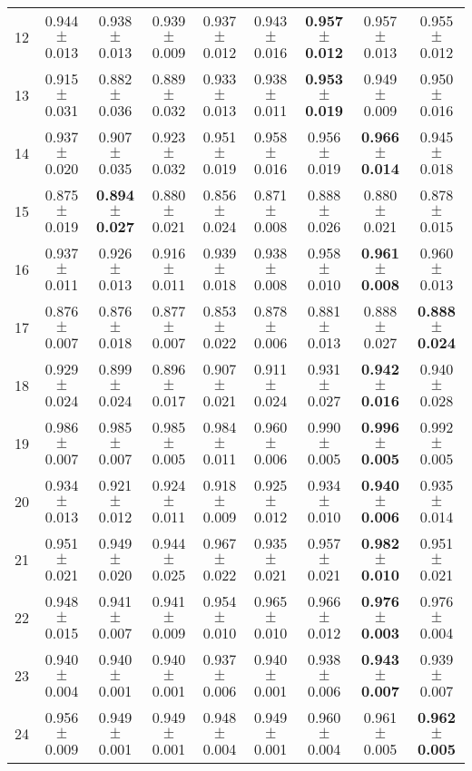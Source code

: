 \begin{table}[!ht]
{\begin{tabular}{r c c c c c c c c}
12 & 0.944 $\pm$ 0.013 & 0.938 $\pm$ 0.013 & 0.939 $\pm$ 0.009 & 0.937 $\pm$ 0.012 & 0.943 $\pm$ 0.016 & \textbf{0.957 $\pm$ 0.012} & 0.957 $\pm$ 0.013 & 0.955 $\pm$ 0.012 \\
13 & 0.915 $\pm$ 0.031 & 0.882 $\pm$ 0.036 & 0.889 $\pm$ 0.032 & 0.933 $\pm$ 0.013 & 0.938 $\pm$ 0.011 & \textbf{0.953 $\pm$ 0.019} & 0.949 $\pm$ 0.009 & 0.950 $\pm$ 0.016 \\
14 & 0.937 $\pm$ 0.020 & 0.907 $\pm$ 0.035 & 0.923 $\pm$ 0.032 & 0.951 $\pm$ 0.019 & 0.958 $\pm$ 0.016 & 0.956 $\pm$ 0.019 & \textbf{0.966 $\pm$ 0.014} & 0.945 $\pm$ 0.018 \\
15 & 0.875 $\pm$ 0.019 & \textbf{0.894 $\pm$ 0.027} & 0.880 $\pm$ 0.021 & 0.856 $\pm$ 0.024 & 0.871 $\pm$ 0.008 & 0.888 $\pm$ 0.026 & 0.880 $\pm$ 0.021 & 0.878 $\pm$ 0.015 \\
16 & 0.937 $\pm$ 0.011 & 0.926 $\pm$ 0.013 & 0.916 $\pm$ 0.011 & 0.939 $\pm$ 0.018 & 0.938 $\pm$ 0.008 & 0.958 $\pm$ 0.010 & \textbf{0.961 $\pm$ 0.008} & 0.960 $\pm$ 0.013 \\
17 & 0.876 $\pm$ 0.007 & 0.876 $\pm$ 0.018 & 0.877 $\pm$ 0.007 & 0.853 $\pm$ 0.022 & 0.878 $\pm$ 0.006 & 0.881 $\pm$ 0.013 & 0.888 $\pm$ 0.027 & \textbf{0.888 $\pm$ 0.024} \\
18 & 0.929 $\pm$ 0.024 & 0.899 $\pm$ 0.024 & 0.896 $\pm$ 0.017 & 0.907 $\pm$ 0.021 & 0.911 $\pm$ 0.024 & 0.931 $\pm$ 0.027 & \textbf{0.942 $\pm$ 0.016} & 0.940 $\pm$ 0.028 \\
19 & 0.986 $\pm$ 0.007 & 0.985 $\pm$ 0.007 & 0.985 $\pm$ 0.005 & 0.984 $\pm$ 0.011 & 0.960 $\pm$ 0.006 & 0.990 $\pm$ 0.005 & \textbf{0.996 $\pm$ 0.005} & 0.992 $\pm$ 0.005 \\
20 & 0.934 $\pm$ 0.013 & 0.921 $\pm$ 0.012 & 0.924 $\pm$ 0.011 & 0.918 $\pm$ 0.009 & 0.925 $\pm$ 0.012 & 0.934 $\pm$ 0.010 & \textbf{0.940 $\pm$ 0.006} & 0.935 $\pm$ 0.014 \\
21 & 0.951 $\pm$ 0.021 & 0.949 $\pm$ 0.020 & 0.944 $\pm$ 0.025 & 0.967 $\pm$ 0.022 & 0.935 $\pm$ 0.021 & 0.957 $\pm$ 0.021 & \textbf{0.982 $\pm$ 0.010} & 0.951 $\pm$ 0.021 \\
22 & 0.948 $\pm$ 0.015 & 0.941 $\pm$ 0.007 & 0.941 $\pm$ 0.009 & 0.954 $\pm$ 0.010 & 0.965 $\pm$ 0.010 & 0.966 $\pm$ 0.012 & \textbf{0.976 $\pm$ 0.003} & 0.976 $\pm$ 0.004 \\
23 & 0.940 $\pm$ 0.004 & 0.940 $\pm$ 0.001 & 0.940 $\pm$ 0.001 & 0.937 $\pm$ 0.006 & 0.940 $\pm$ 0.001 & 0.938 $\pm$ 0.006 & \textbf{0.943 $\pm$ 0.007} & 0.939 $\pm$ 0.007 \\
24 & 0.956 $\pm$ 0.009 & 0.949 $\pm$ 0.001 & 0.949 $\pm$ 0.001 & 0.948 $\pm$ 0.004 & 0.949 $\pm$ 0.001 & 0.960 $\pm$ 0.004 & 0.961 $\pm$ 0.005 & \textbf{0.962 $\pm$ 0.005} \\

\end{tabular}}
\end{table}
